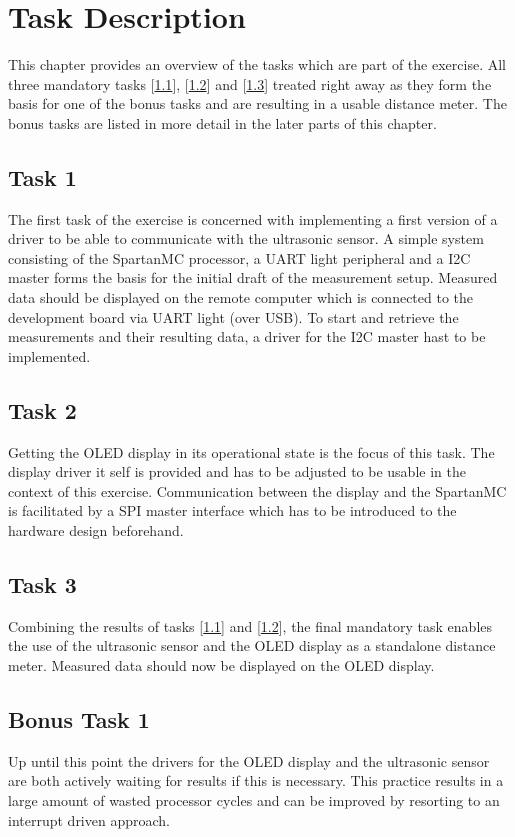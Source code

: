 \chapter{Task Description}
\label{cha:task}
	This chapter provides an overview of the tasks which are part of the exercise. All three mandatory tasks [\ref{sec:task_1}], [\ref{sec:task_2}] and [\ref{sec:task_3}] treated right away as they form the basis for one of the bonus tasks and are resulting in a usable distance meter.
	The bonus tasks are listed in more detail in the later parts of this chapter.

	\section{Task 1} %
	\label{sec:task_1}
		The first task of the exercise is concerned with implementing a first version of a driver to be able to communicate with the ultrasonic sensor. A simple system consisting of the SpartanMC processor, a UART light peripheral and a I2C master forms the basis for the initial draft of the measurement setup.
		Measured data should be displayed on the remote computer which is connected to the development board via UART light (over USB). To start and retrieve the measurements and their resulting data, a driver for the I2C master hast to be implemented.

	\section{Task 2} %
	\label{sec:task_2}
		Getting the OLED display in its operational state is the focus of this task. The display driver it self is provided and has to be adjusted to be usable in the context of this exercise.
		Communication between the display and the SpartanMC is facilitated by a SPI master interface which has to be introduced to the hardware design beforehand.

	\section{Task 3} %
	\label{sec:task_3}
		Combining the results of tasks [\ref{sec:task_1}] and [\ref{sec:task_2}], the final mandatory task enables the use of the ultrasonic sensor and the OLED display as a standalone distance meter. Measured data should now be displayed on the OLED display.

	\section{Bonus Task 1} %
	\label{sec:bonus_task_1}
		Up until this point the drivers for the OLED display and the ultrasonic sensor are both actively waiting for results if this is necessary. This practice results in a large amount of wasted processor cycles and can be improved by resorting to an interrupt driven approach. 

